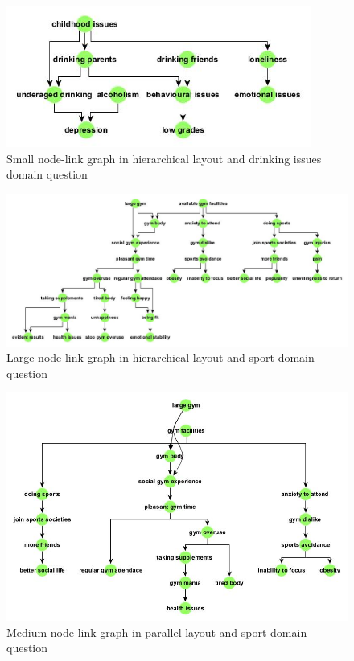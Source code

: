 \documentclass{l4proj}
\begin{document}
\begin{appendices}
\begin{figure}[H]
\centering
\includegraphics[width=10cm]{images/drinkingIssuesSmallHier.jpg}
\caption{Small node-link graph in hierarchical layout and drinking issues domain question}
\label{drinkingIssuesSmallHier}
\end{figure}


\begin{figure}
\centering
\includegraphics[width=20cm]{images/sportLargeHier.jpg}
\caption{Large node-link graph in hierarchical layout and sport domain question}
\label{drinkingIssuesMedOrganic}
\end{figure}


\begin{figure}
\centering
\includegraphics[width=20cm]{images/sportMedParallel.jpg}
\caption{Medium node-link graph in parallel layout and sport domain question}
\label{sportMedParallel}
\end{figure}


\end{appendices}
\end{document}
